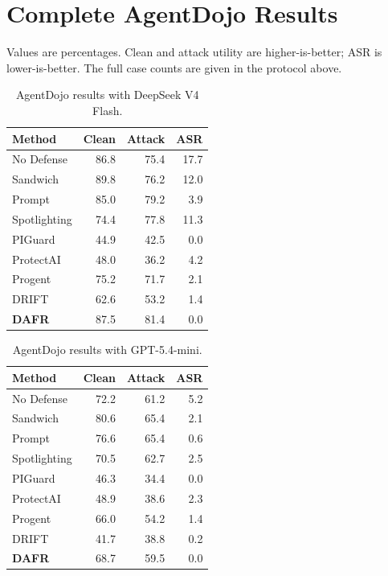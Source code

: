 \documentclass[11pt]{article}
\begin{document}
\section{Complete AgentDojo Results}

Values are percentages. Clean and attack utility are higher-is-better; ASR is lower-is-better. The full case counts are given in the protocol above.

\begin{table}[ht]
\centering\scriptsize
\begin{tabular}{lrrr}
\toprule
Method & Clean & Attack & ASR\\
\midrule
No Defense & 86.8 & 75.4 & 17.7\\
Sandwich & 89.8 & 76.2 & 12.0\\
Prompt & 85.0 & 79.2 & 3.9\\
Spotlighting & 74.4 & 77.8 & 11.3\\
PIGuard & 44.9 & 42.5 & 0.0\\
ProtectAI & 48.0 & 36.2 & 4.2\\
Progent & 75.2 & 71.7 & 2.1\\
DRIFT & 62.6 & 53.2 & 1.4\\
\textbf{DAFR} & 87.5 & 81.4 & 0.0\\
\bottomrule
\end{tabular}
\caption{AgentDojo results with DeepSeek V4 Flash.}
\label{tab:deepseek-full}
\end{table}

\begin{table}[ht]
\centering\scriptsize
\begin{tabular}{lrrr}
\toprule
Method & Clean & Attack & ASR\\
\midrule
No Defense & 72.2 & 61.2 & 5.2\\
Sandwich & 80.6 & 65.4 & 2.1\\
Prompt & 76.6 & 65.4 & 0.6\\
Spotlighting & 70.5 & 62.7 & 2.5\\
PIGuard & 46.3 & 34.4 & 0.0\\
ProtectAI & 48.9 & 38.6 & 2.3\\
Progent & 66.0 & 54.2 & 1.4\\
DRIFT & 41.7 & 38.8 & 0.2\\
\textbf{DAFR} & 68.7 & 59.5 & 0.0\\
\bottomrule
\end{tabular}
\caption{AgentDojo results with GPT-5.4-mini.}
\label{tab:gpt-full}
\end{table}
\end{document}
